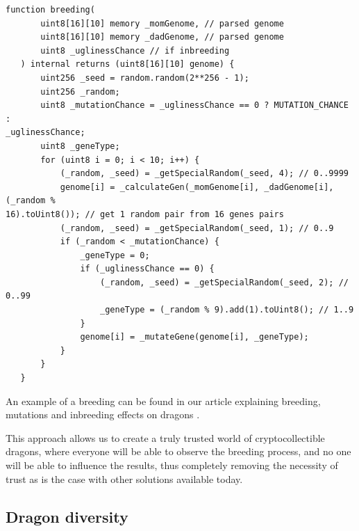 \documentclass[12pt]{article}
\begin{document}
\begin{footnotesize}
\begin{verbatim}
function breeding(
       uint8[16][10] memory _momGenome, // parsed genome
       uint8[16][10] memory _dadGenome, // parsed genome
       uint8 _uglinessChance // if inbreeding
   ) internal returns (uint8[16][10] genome) {
       uint256 _seed = random.random(2**256 - 1);
       uint256 _random;
       uint8 _mutationChance = _uglinessChance == 0 ? MUTATION_CHANCE :
_uglinessChance;
       uint8 _geneType;
       for (uint8 i = 0; i < 10; i++) {
           (_random, _seed) = _getSpecialRandom(_seed, 4); // 0..9999
           genome[i] = _calculateGen(_momGenome[i], _dadGenome[i], (_random % 
16).toUint8()); // get 1 random pair from 16 genes pairs
           (_random, _seed) = _getSpecialRandom(_seed, 1); // 0..9
           if (_random < _mutationChance) {
               _geneType = 0;
               if (_uglinessChance == 0) {
                   (_random, _seed) = _getSpecialRandom(_seed, 2); // 0..99
                   _geneType = (_random % 9).add(1).toUint8(); // 1..9
               }
               genome[i] = _mutateGene(genome[i], _geneType);
           }
       }
   }
\end{verbatim}
\end{footnotesize}

An example of a breeding can be found in our article explaining breeding, mutations and inbreeding effects on dragons \cite{Dragonereum_2018_Mar_26}.\par 

This approach allows us to create a truly trusted world of cryptocollectible dragons, where everyone will be able to observe the breeding process, and no one will be able to influence the results, thus completely removing the necessity of trust as is the case with other solutions available today.

\vspace{\baselineskip}\subsection{Dragon diversity }
\label{Dragon diversity}   
\end{document}
